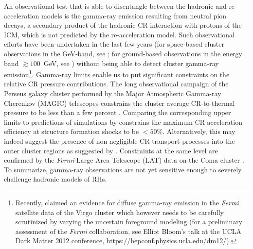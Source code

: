 \documentclass[traditabstract]{aa}
\begin{document}
An observational test that is able to disentangle between the hadronic and
re-acceleration models is the gamma-ray emission resulting from neutral pion
decays, a secondary product of the hadronic CR interaction with protons of the
ICM, which is not predicted by the re-acceleration model. Such observational
efforts have been undertaken in the last few years (for space-based cluster
observations in the GeV-band, see \citealt{2003ApJ...588..155R,
  2010ApJ...717L..71A, 2010JCAP...05..025A, 2012AAS...21920701Z,
  2012arXiv1201.1003H}; for ground-based observations in the energy band
$\gtrsim100$~GeV, see \citealt{2006ApJ...644..148P, 2008AIPC.1085..569P,
  2009A&A...495...27A, 2009arXiv0907.0727T, 2009arXiv0907.3001D,
  2009arXiv0907.5000G, cangaroo_clusters, 2009ApJ...706L.275A,
  2010ApJ...710..634A, 2011arXiv1111.5544M}) without being able to detect
cluster gamma-ray emission\footnote{Recently, \cite{2012arXiv1201.1003H} claimed
  an evidence for diffuse gamma-ray emission in the \emph{Fermi} satellite data
  of the Virgo cluster which however needs to be carefully scrutinized by
  varying the uncertain foreground modeling (for a preliminary assessment of the
  \emph{Fermi} collaboration, see Elliot Bloom's talk at the UCLA Dark Matter
  2012 conference, https://hepconf.physics.ucla.edu/dm12/).}.  Gamma-ray limits
enable us to put significant constraints on the relative CR pressure
contributions. The long observational campaign of the Perseus galaxy cluster
performed by the Major Atmospheric Gamma-ray Cherenkov (MAGIC) telescopes
constrains the cluster average CR-to-thermal pressure to be less than a few
percent \citep{2010ApJ...710..634A,2011arXiv1111.5544M}. Comparing the
corresponding upper limits to predictions of simulations by
\cite{2010MNRAS.409..449P} constrains the maximum CR acceleration efficiency at
structure formation shocks to be $<50\%$.  Alternatively, this may indeed
suggest the presence of non-negligible CR transport processes into the outer
cluster regions as suggested by \cite{2011A&A...527A..99E}.  Constraints at the
same level are confirmed by the \emph{Fermi}-Large Area Telescope (LAT)
data on the Coma cluster \citep{2011arXiv1105.3240P, 2012AAS...21920701Z,
  2012arXiv1201.1003H}. To summarize, gamma-ray observations are not yet
sensitive enough to severely challenge hadronic models of RHs.
\end{document}
